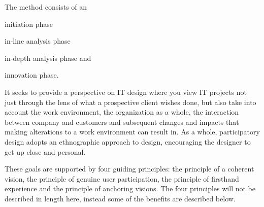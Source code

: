 The \must{}\cite{bodker2004participatory} method consists of an
\begin{inparaenum}[1)]
\item initiation phase
\item in-line analysis phase
\item in-depth analysis phase and
\item innovation phase.
\end{inparaenum}
It seeks to provide a perspective on IT design where you view IT projects not
just through the lens of what a prospective client wishes done, but also take into
account the work environment, the organization as a whole, the interaction
between company and customers and subsequent changes and impacts that making
alterations to a work environment can result in. As a whole, participatory
design adopts an ethnographic approach to design, encouraging the designer to
get up close and personal.

These goals are supported by four guiding principles: the principle of a coherent 
vision, the principle of genuine user participation, the principle of firsthand
experience and the principle of anchoring visions. The four principles will not
be described in length here, instead some of the benefits are described below.

